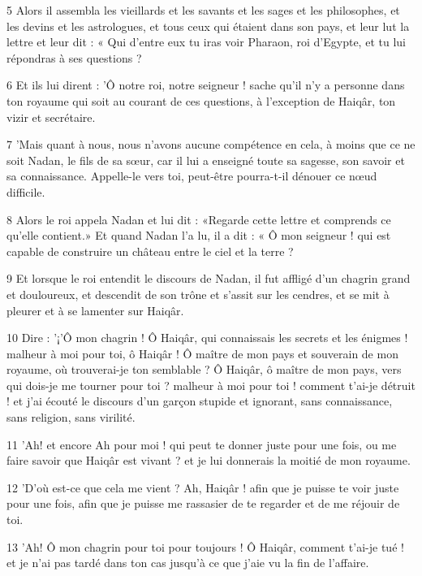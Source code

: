 \par 5 Alors il assembla les vieillards et les savants et les sages et les philosophes, et les devins et les astrologues, et tous ceux qui étaient dans son pays, et leur lut la lettre et leur dit : « Qui d'entre eux tu iras voir Pharaon, roi d'Egypte, et tu lui répondras à ses questions ?

\par 6 Et ils lui dirent : 'Ô notre roi, notre seigneur ! sache qu'il n'y a personne dans ton royaume qui soit au courant de ces questions, à l'exception de Haiqâr, ton vizir et secrétaire.

\par 7 'Mais quant à nous, nous n'avons aucune compétence en cela, à moins que ce ne soit Nadan, le fils de sa sœur, car il lui a enseigné toute sa sagesse, son savoir et sa connaissance. Appelle-le vers toi, peut-être pourra-t-il dénouer ce nœud difficile.

\par 8 Alors le roi appela Nadan et lui dit : «Regarde cette lettre et comprends ce qu'elle contient.» Et quand Nadan l'a lu, il a dit : « Ô mon seigneur ! qui est capable de construire un château entre le ciel et la terre ?

\par 9 Et lorsque le roi entendit le discours de Nadan, il fut affligé d'un chagrin grand et douloureux, et descendit de son trône et s'assit sur les cendres, et se mit à pleurer et à se lamenter sur Haiqâr.

\par 10 Dire : '¡'Ô mon chagrin ! Ô Haiqâr, qui connaissais les secrets et les énigmes ! malheur à moi pour toi, ô Haiqâr ! Ô maître de mon pays et souverain de mon royaume, où trouverai-je ton semblable ? Ô Haiqâr, ô maître de mon pays, vers qui dois-je me tourner pour toi ? malheur à moi pour toi ! comment t'ai-je détruit ! et j'ai écouté le discours d'un garçon stupide et ignorant, sans connaissance, sans religion, sans virilité.

\par 11 'Ah! et encore Ah pour moi ! qui peut te donner juste pour une fois, ou me faire savoir que Haiqâr est vivant ? et je lui donnerais la moitié de mon royaume.

\par 12 'D'où est-ce que cela me vient ? Ah, Haiqâr ! afin que je puisse te voir juste pour une fois, afin que je puisse me rassasier de te regarder et de me réjouir de toi.

\par 13 'Ah! Ô mon chagrin pour toi pour toujours ! Ô Haiqâr, comment t'ai-je tué ! et je n'ai pas tardé dans ton cas jusqu'à ce que j'aie vu la fin de l'affaire.

